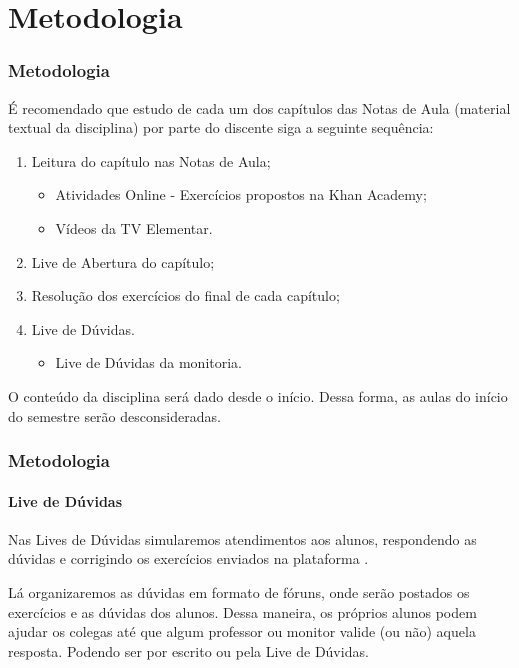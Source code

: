 \section{Metodologia}


\begin{frame}
	\frametitle{Metodologia}

	É recomendado que estudo de cada um dos capítulos das Notas de Aula (material textual da disciplina) por parte do discente siga a seguinte sequência:

	\begin{enumerate}
		\item Leitura do capítulo nas Notas de Aula;
		\begin{itemize}
			\item Atividades Online - Exercícios propostos na Khan Academy;
			\item Vídeos da TV Elementar.
		\end{itemize} \pause
		\item Live de Abertura do capítulo; \pause
		\item Resolução dos exercícios do final de cada capítulo; \pause
		\item Live de Dúvidas.
		\begin{itemize}
			\item Live de Dúvidas da monitoria.
		\end{itemize}
	\end{enumerate} \pause

	\begin{observacao*}
		O conteúdo da disciplina será dado desde o início. Dessa forma, as aulas do início do semestre serão desconsideradas.
	\end{observacao*}
	
\end{frame}


\begin{frame}
	\frametitle{Metodologia}
	\framesubtitle{Live de Dúvidas} 

	Nas Lives de Dúvidas simularemos atendimentos aos alunos, respondendo as dúvidas e corrigindo os exercícios enviados na plataforma .

	Lá organizaremos as dúvidas em formato de fóruns, onde serão postados os exercícios e as dúvidas dos alunos. Dessa maneira, os próprios alunos podem ajudar os colegas até que algum professor ou monitor valide (ou não) aquela resposta. Podendo ser por escrito ou pela Live de Dúvidas.
\end{frame}
